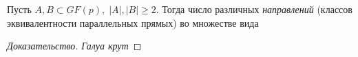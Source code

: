 \documentclass{article}
\newenvironment{theorem}[2][Теорема]{\begin{trivlist}
\item[\hskip \labelsep {\bfseries #1}\hskip \labelsep {\bfseries #2.}]}{\end{trivlist}}
\newenvironment{solution}{\begin{proof}[Доказательство]}{\end{proof}}
\begin{document}
\begin{theorem}{(Benedetto, Solymosi, White, 2020)}
Пусть $A,B\subset GF(p),\; {|A|},{|B|}\ge 2$. Тогда число различных \emph{направлений} (классов эквивалентности параллельных прямых) во множестве вида 
\end{theorem}

\begin{solution}{}
\emph{Галуа крут}
\end{solution}
\end{document}
